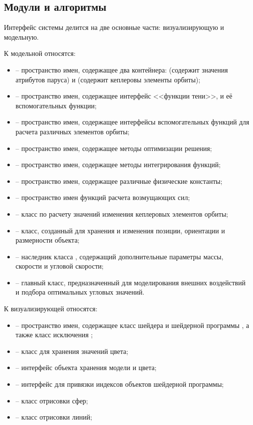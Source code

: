 \subsection{Модули и алгоритмы}
\noindent\indent Интерфейс системы делится на две основные части: визуализирующую и
модельную.\par
    К модельной относятся:
\begin{itemize}
    \item {} -- пространство имен, содержащее два контейнера:
     (содержит значения атрибутов паруса) и
     (содержит кеплеровы элементы орбиты);
    \item {} -- пространство имен, содержащее интерфейс <<функции тени>>,
    и её вспомогательных функции;
    \item {} -- пространство имен, содержащее интерфейсы вспомогательных
    функций для расчета различных элементов орбиты;
    \item {} -- пространство имен, содержащее методы оптимизации
    решения;
    \item {} -- пространство имен, содержащее методы интегрирования
    функций;
    \item {} -- пространство имен, содержащее различные физические
    константы;
    \item {} -- пространство имен функций расчета возмущающих сил;
    \item {} -- класс по расчету значений изменения кеплеровых
    элементов орбиты;
    \item {} -- класс, созданный для хранения и изменения
    позиции, ориентации и размерности объекта;
    \item {} -- наследник класса , содержащий дополнительные
    параметры массы, скорости и угловой скорости;
    \item {} -- главный класс, предназначенный для
    моделирования внешних воздействий и подбора оптимальных угловых значений.
\end{itemize}
    К визуализирующей относятся:
\begin{itemize}
    \item {} -- пространство имен, содержащее класс шейдера  и
    шейдерной программы , а также класс исключения ;
    \item {} -- класс для хранения значений цвета;
    \item {} -- интерфейс объекта хранения модели и цвета;
    \item {} -- интерфейс для привязки индексов объектов шейдерной
    программы;
    \item {} -- класс отрисовки сфер;
    \item {} -- класс отрисовки линий;
\end{itemize}
